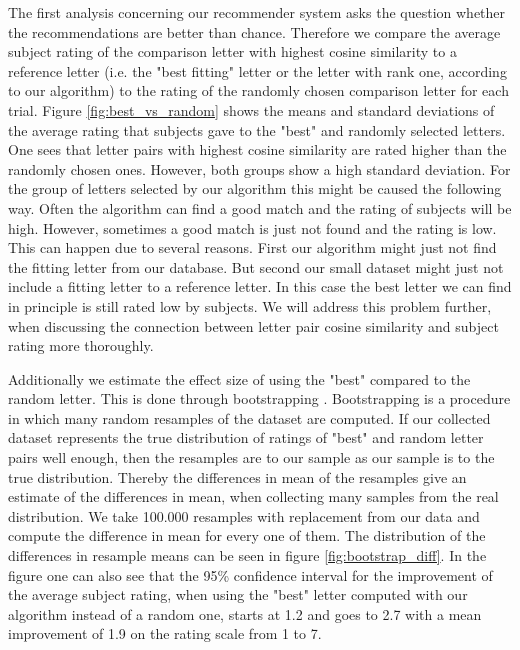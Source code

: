 The first analysis concerning our recommender system asks the question whether the recommendations are better than chance. Therefore we compare the average subject rating of the comparison letter with highest cosine similarity to a reference letter (i.e. the "best fitting" letter or the letter with rank one, according to our algorithm) to the rating of the randomly chosen comparison letter for each trial. Figure \ref{fig:best_vs_random} shows the means and standard deviations of the average rating that subjects gave to the "best" and randomly selected letters. One sees that letter pairs with highest cosine similarity are rated higher than the randomly chosen ones. However, both groups show a high standard deviation. For the group of letters selected by our algorithm this might be caused the following way. Often the algorithm can find a good match and the rating of subjects will be high. However, sometimes a good match is just not found and the rating is low. This can happen due to several reasons. First our algorithm might just not find the fitting letter from our database. But second our small dataset might just not include a fitting letter to a reference letter. In this case the best letter we can find in principle is still rated low by subjects. We will address this problem further, when discussing the connection between letter pair cosine similarity and subject rating more thoroughly. 

Additionally we estimate the effect size of using the "best" compared to the random letter. This is done through bootstrapping \citep{Efron1979}. Bootstrapping is a procedure in which many random resamples of the dataset are computed. If our collected dataset represents the true distribution of ratings of "best" and random letter pairs well enough, then the resamples are to our sample as our sample is to the true distribution. Thereby the differences in mean of the resamples give an estimate of the differences in mean, when collecting many samples from the real distribution. We take 100.000 resamples with replacement from our data and compute the difference in mean for every one of them. The distribution of the differences in resample means can be seen in figure \ref{fig:bootstrap_diff}. In the figure one can also see that the 95\% confidence interval for the improvement of the average subject rating, when using the "best" letter computed with our algorithm instead of a random one, starts at 1.2 and goes to 2.7 with a mean improvement of 1.9 on the rating scale from 1 to 7.

